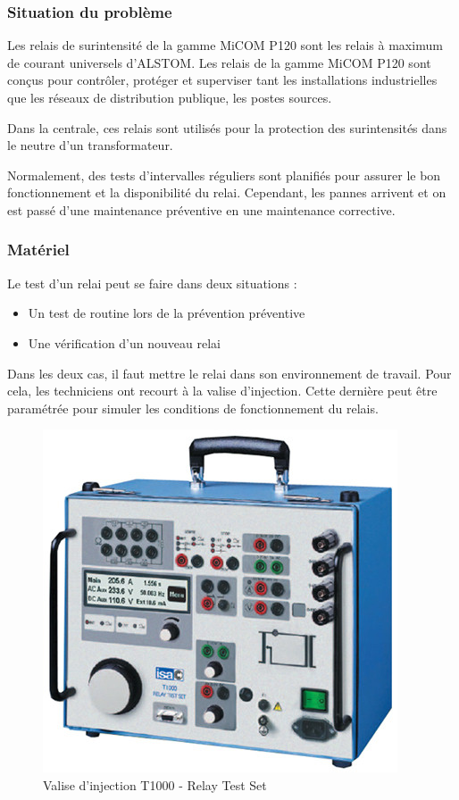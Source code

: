 \subsubsection{Situation du problème}
Les relais de surintensité de la gamme  MiCOM P120  sont les relais à maximum de courant universels d'ALSTOM. Les relais de la gamme MiCOM P120 sont conçus pour contrôler, protéger et superviser tant les installations industrielles que les réseaux de distribution publique, les postes sources.

Dans la centrale, ces relais sont utilisés pour la  protection des surintensités dans le neutre d'un transformateur.

Normalement, des tests d'intervalles réguliers sont planifiés pour assurer le bon fonctionnement et la disponibilité du relai. Cependant, les pannes arrivent et on est passé d'une maintenance préventive en une maintenance corrective.
\pagebreak
\subsubsection{Matériel}
Le test d'un relai peut se faire dans deux situations :

\begin{itemize}
\item Un test de routine lors de la prévention préventive
\item Une vérification d'un nouveau relai
\end{itemize}
Dans les deux cas, il faut mettre le relai dans son   environnement de travail.
Pour cela, les techniciens ont recourt à la valise d'injection.
Cette dernière  peut être paramétrée pour simuler les conditions de fonctionnement du relais. 

\begin{figure}[hbtp]
\centering
\includegraphics[scale=0.4]{./Figures/T1000.jpg}
\caption{Valise d'injection T1000 - Relay Test Set}
\end{figure}


